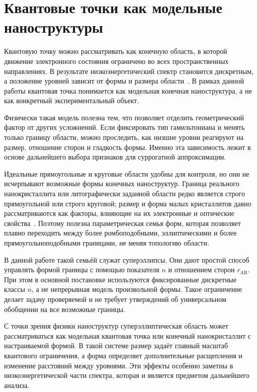 \section{Квантовые точки как модельные наноструктуры}

Квантовую точку можно рассматривать как конечную область, в которой движение электронного
состояния ограничено во всех пространственных направлениях. В результате
низкоэнергетический спектр становится дискретным, а положение уровней зависит от формы и
размера области~\cite{jacak1998quantumdots,kouwenhoven2001fewelectron}. В рамках данной
работы квантовая точка понимается как модельная конечная наноструктура, а не как
конкретный экспериментальный объект.

Физически такая модель полезна тем, что позволяет отделить геометрический фактор от других
усложнений. Если фиксировать тип гамильтониана и менять только границу области, можно
проследить, как низшие уровни реагируют на размер, отношение сторон и гладкость формы.
Именно эта зависимость лежит в основе дальнейшего выбора признаков для суррогатной
аппроксимации.

Идеальные прямоугольные и круговые области удобны для контроля, но они не исчерпывают
возможные формы конечных наноструктур. Граница реального нанокристаллита или
литографически заданной области редко является строго прямоугольной или строго круговой;
размер и форма малых кристаллитов давно рассматриваются как факторы, влияющие на их
электронные и оптические свойства~\cite{brus1984smallcrystallites,alivisatos1996quantumdot
s}. Поэтому полезна параметрическая семья форм, которая позволяет плавно переходить между
более ромбоподобными, эллиптическими и более прямоугольноподобными границами, не меняя
топологию области.

В данной работе такой семьёй служат суперэллипсы. Они дают простой способ управлять формой
границы с помощью показателя $n$ и отношением сторон $r_{\mathrm{AR}}$. При этом в
основной постановке используются фиксированные дискретные классы $n$, а не непрерывная
модель произвольной формы. Такое ограничение делает задачу проверяемой и не требует
утверждений об универсальном обобщении на все возможные границы.

С точки зрения физики наноструктур суперэллиптическая область может рассматриваться как
модельная квантовая точка или конечный нанокристаллит с настраиваемой формой. В такой
системе размер задаёт главный масштаб квантового ограничения, а форма определяет
дополнительные расщепления и изменение расстояний между уровнями. Эти эффекты особенно
заметны в низкоэнергетической части спектра, которая и является предметом дальнейшего
анализа.

